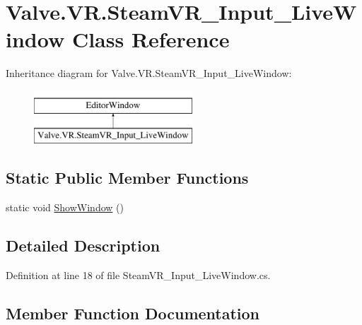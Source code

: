 \hypertarget{class_valve_1_1_v_r_1_1_steam_v_r___input___live_window}{}\section{Valve.\+V\+R.\+Steam\+V\+R\+\_\+\+Input\+\_\+\+Live\+Window Class Reference}
\label{class_valve_1_1_v_r_1_1_steam_v_r___input___live_window}
Inheritance diagram for Valve.\+V\+R.\+Steam\+V\+R\+\_\+\+Input\+\_\+\+Live\+Window\+:\begin{figure}[H]
\begin{center}
\leavevmode
\includegraphics[height=2.000000cm]{class_valve_1_1_v_r_1_1_steam_v_r___input___live_window}
\end{center}
\end{figure}
\subsection*{Static Public Member Functions}
\begin{DoxyCompactItemize}
\item 
static void \mbox{\hyperlink{class_valve_1_1_v_r_1_1_steam_v_r___input___live_window_af0904167a3b5f2d4e77ad3f57b1bc0aa}{Show\+Window}} ()
\end{DoxyCompactItemize}


\subsection{Detailed Description}


Definition at line 18 of file Steam\+V\+R\+\_\+\+Input\+\_\+\+Live\+Window.\+cs.



\subsection{Member Function Documentation}
\mbox{\label{class_valve_1_1_v_r_1_1_steam_v_r___input___live_window_af0904167a3b5f2d4e77ad3f57b1bc0aa}} 
